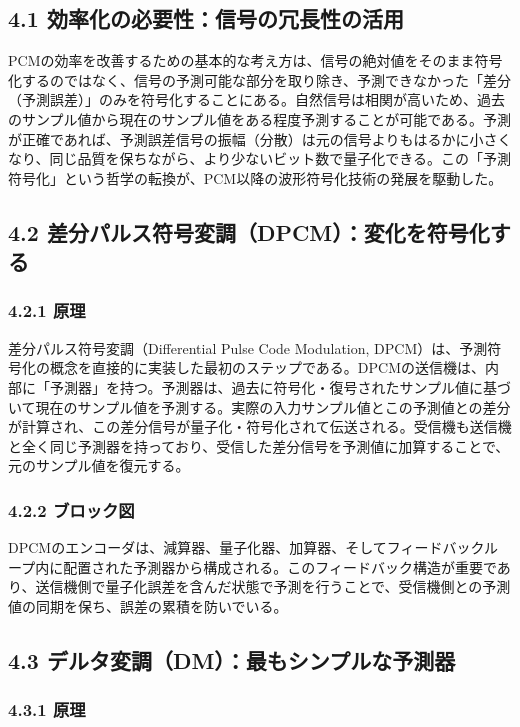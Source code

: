 \documentclass[
  a4paper,  %
  11pt,     %
]{ltjsarticle}%
\begin{document}
\subsection{4.1 効率化の必要性：信号の冗長性の活用}

PCMの効率を改善するための基本的な考え方は、信号の絶対値をそのまま符号化するのではなく、信号の予測可能な部分を取り除き、予測できなかった「差分（予測誤差）」のみを符号化することにある。自然信号は相関が高いため、過去のサンプル値から現在のサンプル値をある程度予測することが可能である。予測が正確であれば、予測誤差信号の振幅（分散）は元の信号よりもはるかに小さくなり、同じ品質を保ちながら、より少ないビット数で量子化できる。この「予測符号化」という哲学の転換が、PCM以降の波形符号化技術の発展を駆動した。

\subsection{4.2 差分パルス符号変調（DPCM）：変化を符号化する}

\subsubsection{4.2.1 原理}

差分パルス符号変調（Differential Pulse Code Modulation, DPCM）は、予測符号化の概念を直接的に実装した最初のステップである\cite{ref2}。DPCMの送信機は、内部に「予測器」を持つ。予測器は、過去に符号化・復号されたサンプル値に基づいて現在のサンプル値を予測する。実際の入力サンプル値とこの予測値との差分が計算され、この差分信号が量子化・符号化されて伝送される。受信機も送信機と全く同じ予測器を持っており、受信した差分信号を予測値に加算することで、元のサンプル値を復元する。

\subsubsection{4.2.2 ブロック図}

DPCMのエンコーダは、減算器、量子化器、加算器、そしてフィードバックループ内に配置された予測器から構成される\cite{ref24}。このフィードバック構造が重要であり、送信機側で量子化誤差を含んだ状態で予測を行うことで、受信機側との予測値の同期を保ち、誤差の累積を防いでいる。

\subsection{4.3 デルタ変調（DM）：最もシンプルな予測器}

\subsubsection{4.3.1 原理}
\end{document}
